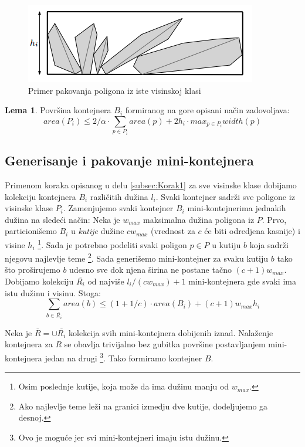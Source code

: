 \documentclass[a4paper]{article}
\theoremstyle{plain}
\theoremstyle{definition}
\newtheorem{lem}[thm]{Lema} %
\begin{document}
\begin{figure}[H]
    \centering
    \includegraphics[scale=0.8]{resources/fig1.PNG}
    \caption{Primer pakovanja poligona iz iste visinskoj klasi}
    \label{fig1}
\end{figure}

\begin{lem}
    Povr\v{s}ina kontejnera $B_{i}$ formiranog na gore opisani na\v{c}in zadovoljava: $$area(P_{i}) \leq 2/\alpha \cdot \sum_{p \in P_{i}}{area(p) + 2h_{i} \cdot max_{p \in P_{i}}{width(p)}}$$
\end{lem}


\subsection{Generisanje i pakovanje mini-kontejnera}
\label{subsec:Korak2}

Primenom koraka opisanog u delu \ref{subsec:Korak1} za sve visinske klase dobijamo kolekciju kontejnera $B_{i}$ razli\v{c}itih du\v{z}ina $l_{i}$. Svaki kontejner sadr\v{z}i sve poligone iz visinske klase $P_{i}$. Zamenjujemo svaki kontejner $B_{i}$ mini-kontejnerima jednakih du\v{z}ina na slede\'c{}i na\v{c}in: Neka je $w_{max}$ maksimalna du\v{z}ina poligona iz $P$. Prvo, particioni\v{s}emo $B_{i}$ u \emph{kutije} du\v{z}ine $cw_{max}$ (vrednost za $c$ \'c{}e biti odredjena kasnije) i visine $h_{i}$ \footnote{Osim poslednje kutije, koja mo\v{z}e da ima du\v{z}inu manju od $w_{max}$.}. Sada je potrebno podeliti svaki poligon $p \in P$ u kutiju $b$ koja sadr\v{z}i njegovu najlevlje teme \footnote{Ako najlevlje teme le\v{z}i na granici izmedju dve kutije, dodeljujemo ga desnoj.}. Sada generi\v{s}emo mini-kontejner za svaku kutiju $b$ tako \v{s}to pro\v{s}irujemo $b$ udesno sve dok njena \v{s}irina ne postane ta\v{c}no $(c+1)w_{max}$. Dobijamo kolekciju $\overline{R_{i}}$ od najvi\v{s}e $l_{i}/(cw_{max}) + 1$ mini-kontejnera gde svaki ima istu du\v{z}inu i visinu. Stoga:
$$\sum_{b \in \overline{R_{i}}}{area(b)} \leq (1 + 1/c) \cdot area(B_{i}) + (c+1)w_{max}h_{i}$$

Neka je $\overline{R} = \cup{\overline{R_{i}}}$ kolekcija svih mini-kontejnera dobijenih iznad. Nala\v{z}enje kontejnera za $R$ se obavlja trivijalno bez gubitka povr\v{s}ine postavljanjem mini-kontejnera jedan na drugi \footnote{Ovo je mogu\'c{}e jer svi mini-kontejneri imaju istu du\v{z}inu.}. Tako formiramo kontejner $B$.
\end{document}
